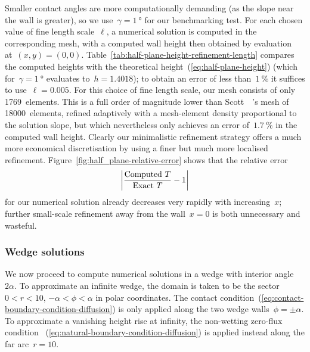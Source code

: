 Smaller contact angles are more computationally demanding
(as the slope near the wall is greater),
so we use~$\gamma = \SI{1}{\degree}$ for our benchmarking test.
For each chosen value of fine length scale~$\ell$,
a numerical solution is computed in the corresponding mesh,
with a computed wall height then obtained
by evaluation at~$(x, y) = (0, 0)$.
Table~\ref{tab:half-plane-height-refinement-length}
compares the computed heights
with the theoretical height~(\ref{eq:half-plane-height})
(which for~$\gamma = \SI{1}{\degree}$ evaluates to~$h = 1.4018$);
to obtain an error of less than~$\SI{1}{\percent}$
it suffices to use~$\ell = 0.005$.
For this choice of fine length scale,
our mesh consists of only 1769~elements.
This is a full order of magnitude lower than
Scott~\etal~\cite{scott-2005-computation-capillary-laplace-young}'s
mesh of 18000~elements, refined adaptively
with a mesh-element density proportional to the solution slope,
but which nevertheless only achieves an error of~$\SI{1.7}{\percent}$
in the computed wall height.
Clearly our minimalistic refinement strategy
offers a much more economical discretisation
by using a finer but much more localised refinement.
Figure~\ref{fig:half_plane-relative-error}
shows that the relative error
\begin{equation}
  \abs*{\frac{\textq{Computed~$T$}}{\textq{Exact~$T$}} - 1}
  \label{eq:half-plane-relative-error}
\end{equation}
for our numerical solution already decreases very rapidly
with increasing~$x$;
further small-scale refinement away from the wall~$x = 0$
is both unnecessary and wasteful.

\begin{figure}
\end{figure}

\subsubsection{Wedge solutions}
\label{sec:moderate.nonlinear.numerical.wedge}

We now proceed to compute numerical solutions
in a wedge with interior angle~$2 \alpha$.
To approximate an infinite wedge,
the domain is taken to be the sector
$0 < r < 10$, $-\alpha < \phi < \alpha$
in polar coordinates.
The contact condition~(\ref{eq:contact-boundary-condition-diffusion})
is only applied along the two wedge walls~$\phi = \pm \alpha$.
To approximate a vanishing height rise at infinity,
the non-wetting zero-flux condition~%
  (\ref{eq:natural-boundary-condition-diffusion})
is applied instead along the far arc~$r = 10$.

